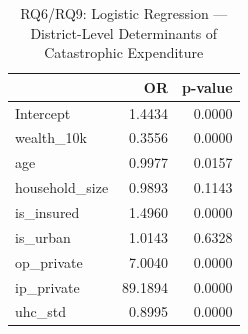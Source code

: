 \begin{table}
\caption{RQ6/RQ9: Logistic Regression — District-Level Determinants of Catastrophic Expenditure}
\label{tab:rq6_logit}
\begin{tabular}{lrr}
\toprule
 & OR & p-value \\
\midrule
Intercept & 1.4434 & 0.0000 \\
wealth_10k & 0.3556 & 0.0000 \\
age & 0.9977 & 0.0157 \\
household_size & 0.9893 & 0.1143 \\
is_insured & 1.4960 & 0.0000 \\
is_urban & 1.0143 & 0.6328 \\
op_private & 7.0040 & 0.0000 \\
ip_private & 89.1894 & 0.0000 \\
uhc_std & 0.8995 & 0.0000 \\
\bottomrule
\end{tabular}
\end{table}
